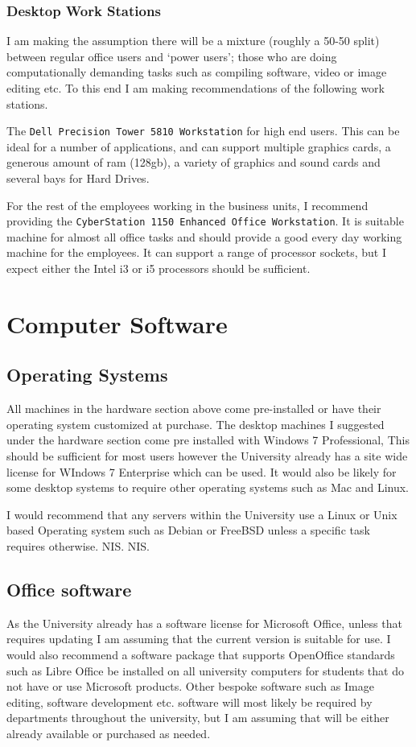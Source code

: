 \documentclass[10pt]{article}
\begin{document}
            \subsubsection{Desktop Work Stations}
                I am making the assumption there will be a mixture (roughly a 50-50 split) between regular office users and `power users'; those who are doing computationally demanding tasks such as compiling software, video or image editing etc. To this end I am making recommendations of the following work stations.

                The \texttt{Dell Precision Tower 5810 Workstation}\cite{cite:powerWorkStation} for high end users. This can be ideal for a number of applications, and can support multiple graphics cards, a generous amount of ram (128gb), a variety of graphics and sound cards and several bays for Hard Drives.

                For the rest of the employees working in the business units, I recommend providing the \texttt{CyberStation 1150 Enhanced Office Workstation}\cite{cite:cyberstation}. It is suitable machine for almost all office tasks and should provide a good every day working machine for the employees. It can support a range of processor sockets, but I expect either the Intel i3 or i5 processors should be sufficient. 

    \section{Computer Software}
        \subsection{Operating Systems}
            \label{sec:operatingSystems}
            All machines in the hardware section above come pre-installed or have their operating system customized at purchase. The desktop machines I suggested under the hardware section come pre installed with Windows 7 Professional, This should be sufficient for most users however the University already has a site wide license for WIndows 7 Enterprise which can be used. It would also be likely for some desktop systems to require other operating systems such as Mac and Linux.

            I would recommend that any servers within the University use a Linux or Unix based Operating system such as Debian or FreeBSD unless a specific task requires otherwise. NIS.
        NIS.
        \subsection{Office software}
            As the University already has a software license for Microsoft Office, unless that requires updating I am assuming that the current version is suitable for use. I would also recommend a software package that supports OpenOffice standards such as Libre Office be installed on all university computers for students that do not have or use Microsoft products. Other bespoke software such as Image editing, software development etc. software will most likely be required by departments throughout the university, but I am assuming that will be either already available or purchased as needed. 
\end{document}
